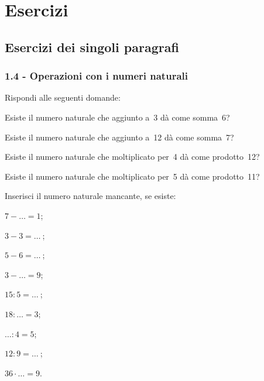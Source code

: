 \section{Esercizi}
\subsection{Esercizi dei singoli paragrafi}
\subsubsection*{1.4 - Operazioni con i numeri naturali}

\begin{esercizio}
\label{ese:1.1}
Rispondi alle seguenti domande:
 \begin{enumeratea}
 \item Esiste il numero naturale che aggiunto a~3 dà come somma~6?
 \item Esiste il numero naturale che aggiunto a~12 dà come somma~7?
 \item Esiste il numero naturale che moltiplicato per~4 dà come prodotto~12?
 \item Esiste il numero naturale che moltiplicato per~5 dà come prodotto~11?
 \end{enumeratea}
\end{esercizio}

\begin{esercizio}
\label{ese:1.2}
 Inserisci il numero naturale mancante, se esiste:
\begin{multicols}{3}
\begin{enumeratea}
 \item $7-\ldots =1$;
 \item$3-3=\ldots~$;
 \item$5-6=\ldots~$;
 \item $3-\ldots =9$;
 \item$15:5=\ldots~$;
 \item$18:\ldots =3$;
 \item $\ldots:4=5$;
 \item$12:9=\ldots~$;
 \item$36\cdot\ldots =9$.
\end{enumeratea}
\end{multicols}
\end{esercizio}

